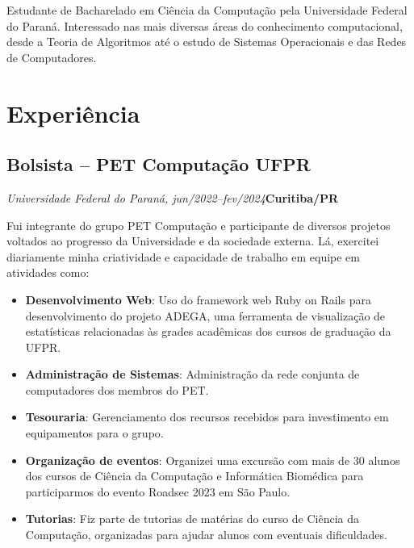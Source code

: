 \documentclass[a4paper, 12pt]{moderncv}
\begin{document}
\makecvtitle

\small{Estudante de Bacharelado em Ciência da Computação pela Universidade
Federal do Paraná. Interessado nas mais diversas áreas do conhecimento
computacional, desde a Teoria de Algoritmos até o estudo de Sistemas
Operacionais e das Redes de Computadores.}

\section{Experiência}
\vspace{1pt}
\subsection{\small{Bolsista -- PET Computação UFPR}}
\textit{Universidade Federal do Paraná, jun/2022--fev/2024}\hspace{170pt}\textbf{Curitiba/PR}

\vspace{3pt}
Fui integrante do grupo PET Computação e participante de diversos projetos
voltados ao progresso da Universidade e da sociedade externa. Lá, exercitei
diariamente minha criatividade e capacidade de trabalho em equipe em
atividades como:
\vspace{4pt}
\begin{itemize}
    \item{\textbf{Desenvolvimento Web}: Uso do framework web Ruby on Rails para
          desenvolvimento do projeto ADEGA, uma ferramenta de visualização de
          estatísticas relacionadas às grades acadêmicas dos cursos de graduação da
          UFPR.}
    \item{\textbf{Administração de Sistemas}: Administração da rede
          conjunta de computadores dos membros do PET.}
    \item{\textbf{Tesouraria}: Gerenciamento dos recursos recebidos para investimento
          em equipamentos para o grupo.}
    \item{\textbf{Organização de eventos}: Organizei uma excursão com mais de
          30 alunos dos cursos de Ciência da Computação e Informática Biomédica
          para participarmos do evento Roadsec 2023 em São Paulo.}
    \item{\textbf{Tutorias}: Fiz parte de tutorias de matérias do curso de Ciência
          da Computação, organizadas para ajudar alunos com eventuais dificuldades.}
\end{itemize}

\vspace{4pt}
\end{document}
